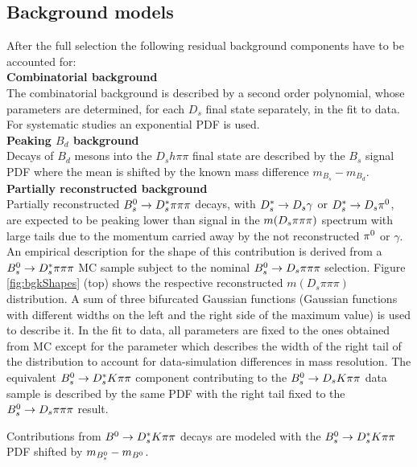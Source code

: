 \subsection{Background models} 
\label{subsec:bkgModel}

After the full selection the following residual background components have to be accounted for: \\

\noindent \textbf{Combinatorial background}  \\
The combinatorial background is described by a second order polynomial,
whose parameters are determined, for each $D_s$ final state separately, in the fit to data.
For systematic studies an exponential PDF is used.
\\

\noindent\textbf{Peaking $B_d$ background}  \\
Decays of $B_d$ mesons into the $D_s h \pi \pi$ final state are described by the $B_s$ signal PDF where the mean is shifted by the known mass difference $m_{B_s} - m_{B_d}$\cite{PDG2016}.
\\

\noindent \textbf{Partially reconstructed background}  \\
Partially reconstructed ${{B}^0_{s}}\rightarrow D_s^{*}\pi{\ensuremath{\pi}}{\ensuremath{\pi}}$ decays, with $D_s^{*}\rightarrow{\ensuremath{{D}_{s}}}\gamma$ or $D_s^{*}\rightarrow{\ensuremath{{D}_{s}}}{\ensuremath{{\pi}^0}}$,
are expected to be peaking lower than signal in the $m({{D}_{s}}{\pi}{\pi}{\pi})$ spectrum with large tails due to the %
momentum carried away by the not reconstructed ${{\pi}^0}$ or $\gamma$. 
An empirical description for the shape of this contribution is derived from a ${{B}^0_{s}}\rightarrow D_s^{*}\pi{\ensuremath{\pi}}{\ensuremath{\pi}}$ MC sample subject to the nominal ${{B}^0_{s}}\rightarrow D_s\pi{\ensuremath{\pi}}{\ensuremath{\pi}}$ selection.
Figure \ref{fig:bgkShapes} (top) shows the respective reconstructed $m(D_s\pi\pi\pi)$ distribution.
A sum of three bifurcated Gaussian functions (\ie Gaussian functions with different widths on the left and the right side of the maximum value) is used to describe it.
In the fit to data, all parameters are fixed to the ones obtained from MC except for the parameter which describes the width of the right tail of the distribution to account for
data-simulation differences in mass resolution.
The equivalent ${{B}^0_{s}}\rightarrow D_s^{*}K{\pi}{\pi}$ component contributing to the ${{B}^0_{s}}\rightarrow D_s K{\pi}{\pi}$ data sample is described by the same PDF with the right tail fixed to the 
${{B}^0_{s}}\rightarrow D_s \pi{\ensuremath{\pi}}{\ensuremath{\pi}}$ result.

Contributions from ${{B}^0}\rightarrow D_s^{*}K{\pi}{\pi}$ decays are modeled with the ${{B}^0_{s}}\rightarrow D_s^{*}K{\pi}{\pi}$ PDF  shifted by $m_{{{B}^0_{s}}} - m_{{{B}^0}}$. \\

